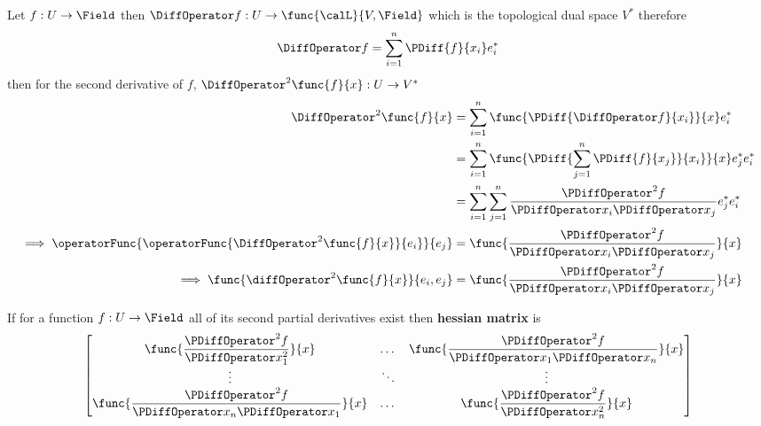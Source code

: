 Let \(f: U \to \Field\) then \(\DiffOperator f: U \to \func{\calL}{V,\Field}\) which is the topological dual space \(V^\ast\) therefore
\begin{equation*}
    \DiffOperator f = \sum_{i = 1}^n \PDiff{f}{x_i} e^\ast_i
\end{equation*}
then for the second derivative of \(f\), \(\DiffOperator^2 \func{f}{x} : U \to V^\ast\)
\begin{align*}
    \DiffOperator^2 \func{f}{x}                                                  & = \sum_{i = 1}^n \func{\PDiff{\DiffOperator f}{x_i}}{x} e^\ast_i                                                     \\
                                                                                 & = \sum_{i = 1}^n \func{\PDiff{\sum_{j = 1}^n \PDiff{f}{x_j}}{x_i}}{x}  e^\ast_j e^\ast_i                             \\
                                                                                 & =  \sum_{i = 1}^n \sum_{j = 1}^n \dfrac{\PDiffOperator^2 f}{\PDiffOperator x_i \PDiffOperator x_j} e^\ast_j e^\ast_i \\
    \implies \operatorFunc{\operatorFunc{\DiffOperator^2 \func{f}{x}}{e_i}}{e_j} & = \func{\dfrac{\PDiffOperator^2 f}{\PDiffOperator x_i \PDiffOperator x_j}}{x}                                        \\
    \implies \func{\diffOperator^2 \func{f}{x}}{e_i,e_j}                         & = \func{\dfrac{\PDiffOperator^2 f}{\PDiffOperator x_i \PDiffOperator x_j}}{x}
\end{align*}

\begin{definition}
    If for a function \(f : U \to \Field\) all of its second partial derivatives exist then \textbf{hessian matrix} is
    \begin{equation*}
        \begin{bmatrix}
            \func{\dfrac{\PDiffOperator^2 f}{\PDiffOperator x_1^2}}{x}                  & \dots  & \func{\dfrac{\PDiffOperator^2 f}{\PDiffOperator x_1 \PDiffOperator x_n}}{x} \\
            \vdots                                                                      & \ddots & \vdots                                                                      \\
            \func{\dfrac{\PDiffOperator^2 f}{\PDiffOperator x_n \PDiffOperator x_1}}{x} & \dots  & \func{\dfrac{\PDiffOperator^2 f}{\PDiffOperator x_n^2}}{x}
        \end{bmatrix}
    \end{equation*}
\end{definition}

